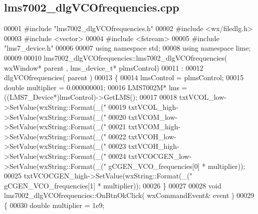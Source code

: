 \subsection{lms7002\+\_\+dlg\+V\+C\+Ofrequencies.\+cpp}
\label{lms7002__dlgVCOfrequencies_8cpp_source}

\begin{DoxyCode}
00001 \textcolor{preprocessor}{#include "lms7002_dlgVCOfrequencies.h"}
00002 \textcolor{preprocessor}{#include <wx/filedlg.h>}
00003 \textcolor{preprocessor}{#include <vector>}
00004 \textcolor{preprocessor}{#include <fstream>}
00005 \textcolor{preprocessor}{#include "lms7_device.h"}
00006 
00007 \textcolor{keyword}{using namespace }std;
00008 \textcolor{keyword}{using namespace }lime;
00009 
00010 lms7002_dlgVCOfrequencies::lms7002_dlgVCOfrequencies( wxWindow* parent , 
      lms_device_t* plmsControl)
00011 :
00012 dlgVCOfrequencies( parent )
00013 \{
00014     lmsControl = plmsControl;
00015     \textcolor{keywordtype}{double} multiplier = 0.000000001;
00016     LMS7002M* lms = ((LMS7_Device*)lmsControl)->GetLMS();
00017 
00018     txtVCOL_low->SetValue(wxString::Format(\_(\textcolor{stringliteral}{"%
00019     txtVCOL_high->SetValue(wxString::Format(\_(\textcolor{stringliteral}{"%
00020     txtVCOM_low->SetValue(wxString::Format(\_(\textcolor{stringliteral}{"%
00021     txtVCOM_high->SetValue(wxString::Format(\_(\textcolor{stringliteral}{"%
00022     txtVCOH_low->SetValue(wxString::Format(\_(\textcolor{stringliteral}{"%
00023     txtVCOH_high->SetValue(wxString::Format(\_(\textcolor{stringliteral}{"%
00024     txtVCOCGEN_low->SetValue(wxString::Format(\_(\textcolor{stringliteral}{"%
      gCGEN_VCO_frequencies[0] * multiplier));
00025     txtVCOCGEN_high->SetValue(wxString::Format(\_(\textcolor{stringliteral}{"%
      gCGEN_VCO_frequencies[1] * multiplier));
00026 \}
00027 
00028 \textcolor{keywordtype}{void} lms7002_dlgVCOfrequencies::OnBtnOkClick( wxCommandEvent& event )
00029 \{
00030     \textcolor{keywordtype}{double} multiplier = 1e9;
}}}}}}}}
\end{DoxyCode}

